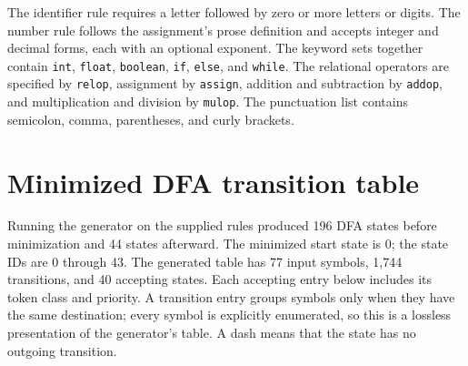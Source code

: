 \documentclass[11pt,a4paper]{article}
\newcommand{\code}[1]{\texttt{#1}}
\begin{document}
The identifier rule requires a letter followed by zero or more letters
or digits. The number rule follows the assignment's prose definition and
accepts integer and decimal forms, each with an optional exponent. The
keyword sets together contain \code{int}, \code{float}, \code{boolean},
\code{if}, \code{else}, and \code{while}. The relational operators are
specified by \code{relop}, assignment by \code{assign}, addition and
subtraction by \code{addop}, and multiplication and division by
\code{mulop}. The punctuation list contains semicolon, comma,
parentheses, and curly brackets.

\section{Minimized DFA transition table}

Running the generator on the supplied rules produced 196 DFA states
before minimization and 44 states afterward. The minimized start state
is 0; the state IDs are 0 through 43. The generated table has 77 input
symbols, 1,744 transitions, and 40 accepting states. Each accepting
entry below includes its token class and priority. A transition entry
groups symbols only when they have the same destination; every symbol
is explicitly enumerated, so this is a lossless presentation of the
generator's table. A dash means that the state has no outgoing
transition.
\end{document}
